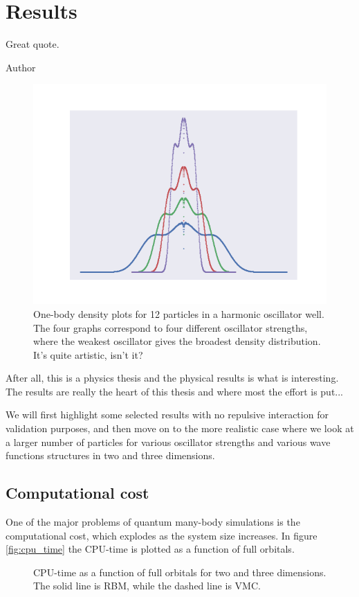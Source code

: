 \chapter{Results} \label{sec:results}
\epigraph{Great quote.}{Author}
\begin{figure}[H]
	\centering
	\includegraphics[scale=0.8]{Images/art.png}
	\caption{One-body density plots for 12 particles in a harmonic oscillator well. The four graphs correspond to four different oscillator strengths, where the weakest oscillator gives the broadest density distribution. It's quite artistic, isn't it?}
\end{figure}
After all, this is a physics thesis and the physical results is what is interesting. 
The results are really the heart of this thesis and where most the effort is put... 

We will first highlight some selected results with no repulsive interaction for validation purposes, and then move on to the more realistic case where we look at a larger number of particles for various oscillator strengths and various wave functions structures in two and three dimensions.  

\newpage
\section{Computational cost}
One of the major problems of quantum many-body simulations is the computational cost, which explodes as the system size increases. In figure \eqref{fig:cpu_time} the CPU-time is plotted as a function of full orbitals. 
\begin{figure}[H]
	\centering
	\label{fig:cpu_time}
	\caption{CPU-time as a function of full orbitals for two and three dimensions. The solid line is RBM, while the dashed line is VMC.}
\end{figure}

